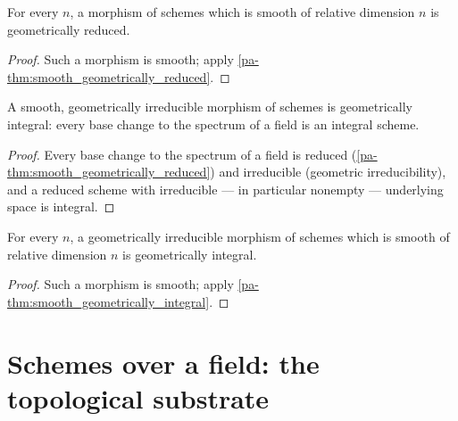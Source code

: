 \begin{lemma}
  \label{pa-lem:relDim_geometrically_reduced}
  \leanok

  For every \(n\), a morphism of schemes which is smooth of relative dimension \(n\) is
  geometrically reduced.
\end{lemma}
\begin{proof}
  \leanok
  Such a morphism is smooth; apply \ref{pa-thm:smooth_geometrically_reduced}.
\end{proof}

\begin{theorem}
  \label{pa-thm:smooth_geometrically_integral}
  \leanok

  A smooth, geometrically irreducible morphism of schemes is geometrically integral: every
  base change to the spectrum of a field is an integral scheme.
\end{theorem}
\begin{proof}
  \leanok
  Every base change to the spectrum of a field is reduced
  (\ref{pa-thm:smooth_geometrically_reduced}) and irreducible (geometric irreducibility), and a
  reduced scheme with irreducible --- in particular nonempty --- underlying space is integral.
\end{proof}

\begin{theorem}
  \label{pa-thm:relDim_geometrically_integral}
  \leanok

  For every \(n\), a geometrically irreducible morphism of schemes which is smooth of relative
  dimension \(n\) is geometrically integral.
\end{theorem}
\begin{proof}
  \leanok
  Such a morphism is smooth; apply \ref{pa-thm:smooth_geometrically_integral}.
\end{proof}

\section{Schemes over a field: the topological substrate}

